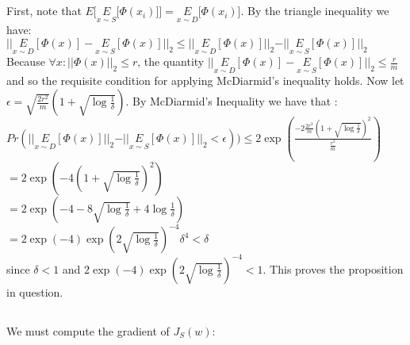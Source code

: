 \documentclass[]{article}
\begin{document}
\pagebreak

\section{}
\subsection{}

First, note that $E\lbrack \underset{x \sim S}{E}\lbrack \Phi(x_i) \rbrack \rbrack = \underset{x \sim D}{E}\lbrack \Phi(x_i) \rbrack$. By the triangle inequality we have:\\

$\vert \vert \underset{x \sim D}{E}[\Phi(x)] - \underset{x \sim S}{E}[\Phi(x)]\vert \vert_2 \le \vert \vert \underset{x \sim D}{E}[\Phi(x)]\vert \vert_2 - \vert \vert \underset{x \sim S}{E}[\Phi(x)]\vert \vert_2$\\

\noindent Because $\forall x: \vert \vert\Phi(x)\vert \vert_2 \le r$, the quantity $\vert \vert \underset{x \sim D}{E}[\Phi(x)] - \underset{x \sim S}{E}[\Phi(x)]\vert \vert_2 \le \frac{r}{m}$ and so the requisite condition for applying McDiarmid's inequality holds. Now let $\epsilon = \sqrt{\frac{2r^2}{m}}(1+\sqrt{\log \frac{1}{\delta}})$. By McDiarmid's Inequality we have that :\\

$Pr( \vert \vert \underset{x \sim D}{E}[\Phi(x)]\vert \vert_2 - \vert \vert \underset{x \sim S}{E}[\Phi(x)]\vert \vert_2 < \epsilon)) \le 2 \exp(\frac{- 2 \frac{2r^2}{m}(1+\sqrt{\log \frac{1}{\delta}})^2}{\frac{r^2}{m}})$\\

$= 2 \exp(- 4 (1+\sqrt{\log \frac{1}{\delta}})^2)$\\

$ = 2 \exp(- 4 - 8\sqrt{\log\frac{1}{\delta}} + 4\log\frac{1}{\delta})$\\

$= 2 \exp(-4)\exp(2\sqrt{\log\frac{1}{\delta}})^{-4}\delta^4 < \delta$\\

\noindent since $\delta < 1$ and $2 \exp(-4)\exp(2\sqrt{\log\frac{1}{\delta}})^{-4} < 1$. This proves the proposition in question.

\subsection{}

We must compute the gradient of $J_S(w)$:
\end{document}
